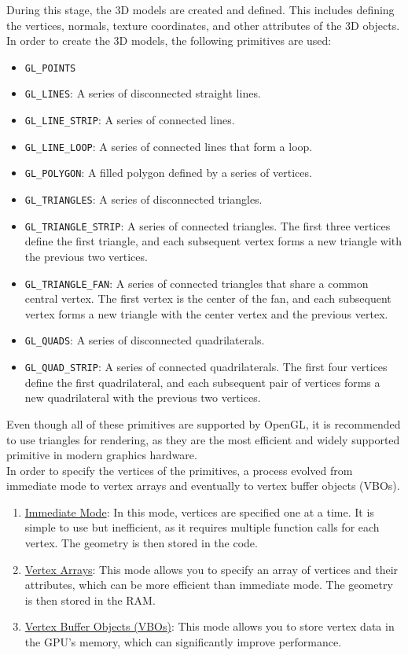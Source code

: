 During this stage, the 3D models are created and defined. This includes defining the vertices, normals, texture coordinates, and other attributes of the 3D objects. In order to create the 3D models, the following primitives are used:
\begin{itemize}
    \item \texttt{GL\_POINTS}
    \item \texttt{GL\_LINES}: A series of disconnected straight lines.
    \item \texttt{GL\_LINE\_STRIP}: A series of connected lines.
    \item \texttt{GL\_LINE\_LOOP}: A series of connected lines that form a loop.
    \item \texttt{GL\_POLYGON}: A filled polygon defined by a series of vertices.
    \item \texttt{GL\_TRIANGLES}: A series of disconnected triangles.
    \item \texttt{GL\_TRIANGLE\_STRIP}: A series of connected triangles. The first three vertices define the first triangle, and each subsequent vertex forms a new triangle with the previous two vertices.
    \item \texttt{GL\_TRIANGLE\_FAN}: A series of connected triangles that share a common central vertex. The first vertex is the center of the fan, and each subsequent vertex forms a new triangle with the center vertex and the previous vertex.
    \item \texttt{GL\_QUADS}: A series of disconnected quadrilaterals.
    \item \texttt{GL\_QUAD\_STRIP}: A series of connected quadrilaterals. The first four vertices define the first quadrilateral, and each subsequent pair of vertices forms a new quadrilateral with the previous two vertices.
\end{itemize}

Even though all of these primitives are supported by OpenGL, it is recommended to use triangles for rendering, as they are the most efficient and widely supported primitive in modern graphics hardware.\\

In order to specify the vertices of the primitives, a process evolved from immediate mode to vertex arrays and eventually to vertex buffer objects (VBOs).
\begin{enumerate}
    \item \ul{Immediate Mode}: In this mode, vertices are specified one at a time. It is simple to use but inefficient, as it requires multiple function calls for each vertex. The geometry is then stored in the code.
    \item \ul{Vertex Arrays}: This mode allows you to specify an array of vertices and their attributes, which can be more efficient than immediate mode. The geometry is then stored in the RAM.
    \item \ul{Vertex Buffer Objects (VBOs)}: This mode allows you to store vertex data in the GPU's memory, which can significantly improve performance.
\end{enumerate}

